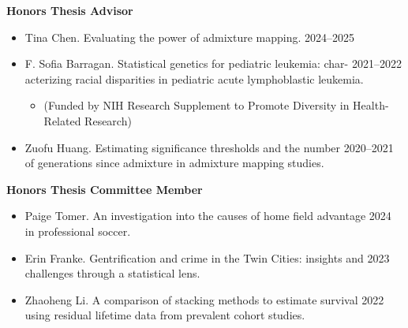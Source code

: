 \documentclass[margin]{res}
\begin{document}
\begin{resume}

\textbf{Honors Thesis Advisor}
\begin{itemize}
\item Tina Chen. Evaluating the power of admixture mapping. \hfill 2024--2025
\item F. Sofia Barragan. Statistical genetics for pediatric leukemia: char- \hfill 2021--2022 \\ acterizing racial disparities in pediatric acute lymphoblastic leukemia.
	\begin{itemize}[leftmargin=-0in]  \vspace{-0.2cm}
	\item[]\begin{footnotesize}(Funded by NIH Research Supplement to Promote Diversity in Health-Related Research) \end{footnotesize}
	\end{itemize}
\item Zuofu Huang. Estimating significance thresholds and the number  \hfill 2020--2021 \\of generations since admixture in admixture mapping studies. %
\end{itemize}

\textbf{Honors Thesis Committee Member}
\begin{itemize}
\item Paige Tomer.  An investigation into the causes of home field advantage \hfill 2024 \\ in professional soccer. 
\item Erin Franke. Gentrification and crime in the Twin Cities: insights and \hfill 2023 \\ challenges through a statistical lens. 
\item Zhaoheng Li. A comparison of stacking methods to estimate survival  \hfill 2022 \\ using residual lifetime data from prevalent cohort studies.  %
\end{itemize}


\end{resume}
\end{document}
